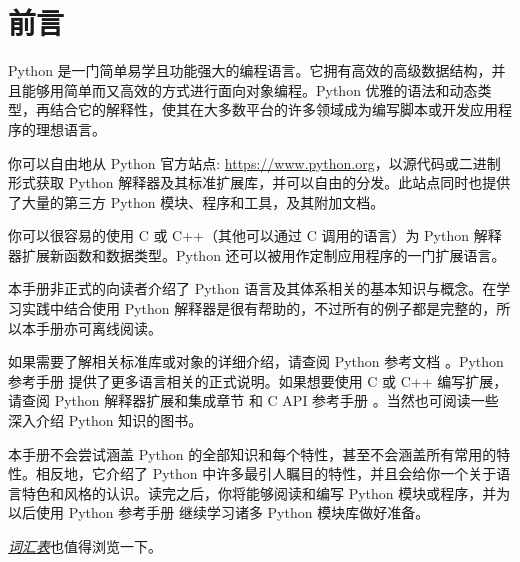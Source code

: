 \chapter*{前\quad 言}
Python 是一门简单易学且功能强大的编程语言。它拥有高效的高级数据结构，并且能够用简单而又高效的方式进行面向对象编程。Python 优雅的语法和动态类型，再结合它的解释性，使其在大多数平台的许多领域成为编写脚本或开发应用程序的理想语言。

你可以自由地从 Python 官方站点: \url{https://www.python.org}，以源代码或二进制形式获取 Python 解释器及其标准扩展库，并可以自由的分发。此站点同时也提供了大量的第三方 Python 模块、程序和工具，及其附加文档。

你可以很容易的使用 C 或 C++（其他可以通过 C 调用的语言）为 Python 解释器扩展新函数和数据类型。Python 还可以被用作定制应用程序的一门扩展语言。

本手册非正式的向读者介绍了 Python 语言及其体系相关的基本知识与概念。在学习实践中结合使用 Python 解释器是很有帮助的，不过所有的例子都是完整的，所以本手册亦可离线阅读。

如果需要了解相关标准库或对象的详细介绍，请查阅 Python 参考文档 。Python 参考手册 提供了更多语言相关的正式说明。如果想要使用 C 或 C++ 编写扩展，请查阅 Python 解释器扩展和集成章节 和 C API 参考手册 。当然也可阅读一些深入介绍 Python 知识的图书。

本手册不会尝试涵盖 Python 的全部知识和每个特性，甚至不会涵盖所有常用的特性。相反地，它介绍了 Python 中许多最引人瞩目的特性，并且会给你一个关于语言特色和风格的认识。读完之后，你将能够阅读和编写 Python 模块或程序，并为以后使用 Python 参考手册 继续学习诸多 Python 模块库做好准备。

\href{https://docs.python.org/3/glossary.html}{\emph{词汇表}}也值得浏览一下。\\